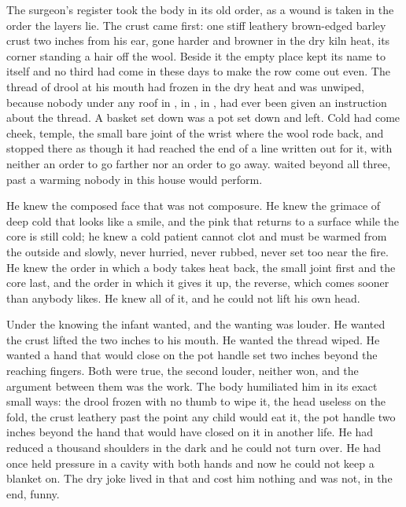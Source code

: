 The surgeon's register took the body in its old order, as a wound is taken in the order the layers lie. The crust came first: one stiff leathery brown-edged barley crust two inches from his ear, gone harder and browner in the dry kiln heat, its corner standing a hair off the wool. Beside it the empty place kept its name to itself and no third had come in these days to make the row come out even. The thread of drool at his mouth had frozen in the dry heat and was unwiped, because nobody under any roof in , in , in , had ever been given an instruction about the thread. A basket set down was a pot set down and left. Cold had come cheek, temple, the small bare joint of the wrist where the wool rode back, and stopped there as though it had reached the end of a line written out for it, with neither an order to go farther nor an order to go away.  waited beyond all three, past a warming nobody in this house would perform.

He knew the composed face that was not composure. He knew the grimace of deep cold that looks like a smile, and the pink that returns to a surface while the core is still cold; he knew a cold patient cannot clot and must be warmed from the outside and slowly, never hurried, never rubbed, never set too near the fire. He knew the order in which a body takes heat back, the small joint first and the core last, and the order in which it gives it up, the reverse, which comes sooner than anybody likes. He knew all of it, and he could not lift his own head.

Under the knowing the infant wanted, and the wanting was louder. He wanted the crust lifted the two inches to his mouth. He wanted the thread wiped. He wanted a hand that would close on the pot handle set two inches beyond the reaching fingers. Both were true, the second louder, neither won, and the argument between them was the work. The body humiliated him in its exact small ways: the drool frozen with no thumb to wipe it, the head useless on the fold, the crust leathery past the point any child would eat it, the pot handle two inches beyond the hand that would have closed on it in another life. He had reduced a thousand shoulders in the dark and he could not turn over. He had once held pressure in a cavity with both hands and now he could not keep a blanket on. The dry joke lived in that and cost him nothing and was not, in the end, funny.

\scenebreak

